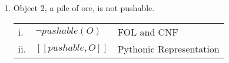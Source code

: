 \documentclass{article}
\begin{document}
\begin{enumerate}
\begin{enumerate}
        \item Object 2, a pile of ore, is not pushable.\\
        \begin{tabular}{lll}
            i. & $\neg pushable(O)$ & FOL and CNF\\
            ii. & $[[pushable, O]]$  & Pythonic Representation
        \end{tabular}\\\\

    \end{enumerate}


\end{enumerate}
\end{document}
